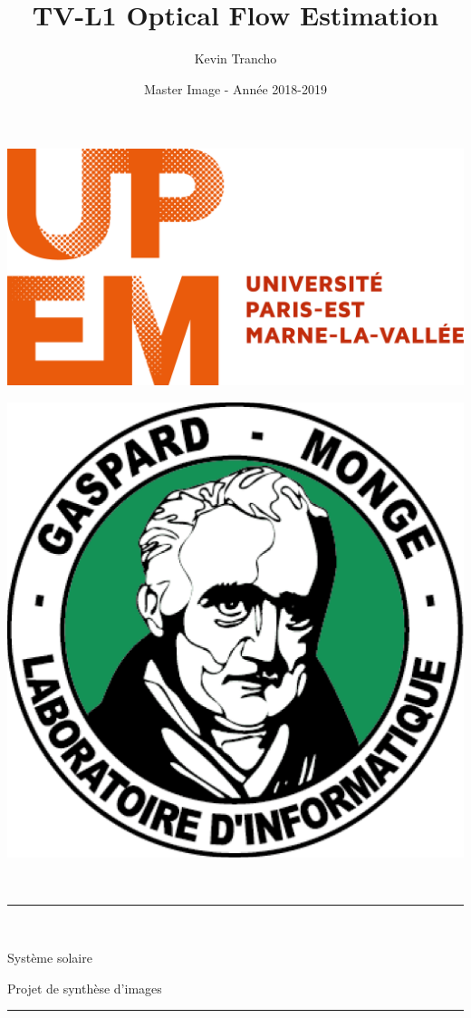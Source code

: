 \documentclass[11pt,a4paper]{article}
\title{TV-L1 Optical Flow Estimation}
\author{Kevin Trancho}
\date{Master Image - Année 2018-2019}
\newcommand{\HRule}{\rule{\linewidth}{0.1mm}}
\begin{document}
\begin{titlepage}
\begin{sffamily}
\begin{center}

\begin{minipage}{0.49\textwidth}
\begin{flushleft}
\includegraphics[width=0.8\columnwidth]{UPEM_LOGO.png}
\end{flushleft}
\end{minipage}
\begin{minipage}{0.49\textwidth}
\begin{flushright}
\includegraphics[width=0.45\columnwidth]{MONGE_LOGO.png}
\end{flushright}
\end{minipage}

~\\[1.25cm]


\HRule \\[0.22cm]
    { \begin{Huge} Système solaire\\[0.42cm]\end{Huge}\begin{Large}Projet de synthèse d'images\\[0.22cm]\end{Large}}
 \HRule \\[0.62cm]

\vspace*{1\baselineskip}


\end{center}
\end{sffamily}
\end{titlepage}
\end{document}
